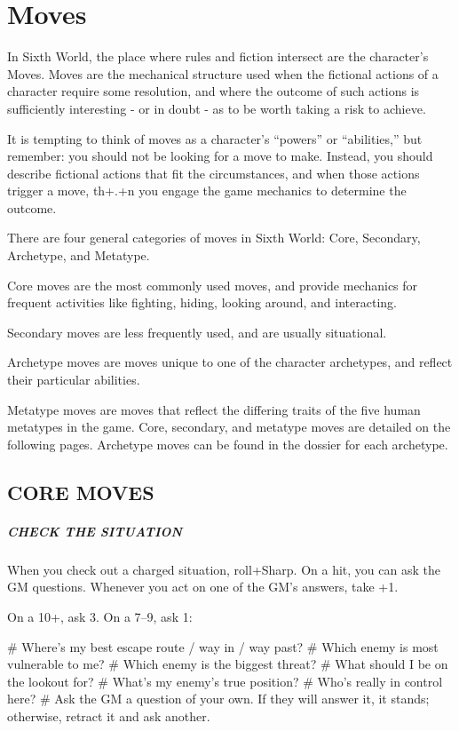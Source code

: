 \chapter{Moves} \label{moves}

In Sixth World, the place where rules and fiction intersect are the character’s Moves. Moves are the mechanical structure used when the fictional actions of a character require some resolution, and where the outcome of such actions is sufficiently interesting - or in doubt - as to be worth taking a risk to achieve.

It is tempting to think of moves as a character’s “powers” or “abilities,” but remember: you should not be looking for a move to make. Instead, you should describe fictional actions that fit the circumstances, and when those actions trigger a move, th+.+n you engage the game mechanics to determine the outcome.

There are four general categories of moves in Sixth World: Core, Secondary, Archetype, and Metatype.

Core moves are the most commonly used moves, and provide mechanics for frequent activities like fighting, hiding, looking around, and interacting.

Secondary moves are less frequently used, and are usually situational.

Archetype moves are moves unique to one of the character archetypes, and reflect their particular abilities.

Metatype moves are moves that reflect the differing traits of the five human metatypes in the game. Core, secondary, and metatype moves are detailed on the following pages. Archetype moves can be found in the dossier for each archetype.

\section{CORE MOVES}

\paragraph{CHECK THE SITUATION}
When you check out a charged situation, roll+Sharp. On a hit, you can ask the GM questions. Whenever you act on one of the GM’s answers, take +1.

On a 10+, ask 3. On a 7–9, ask 1:

\begin{easylist}
# Where’s my best escape route / way in / way past?
# Which enemy is most vulnerable to me?
# Which enemy is the biggest threat?
# What should I be on the lookout for?
# What’s my enemy’s true position?
# Who’s really in control here?
# Ask the GM a question of your own. If they will answer it, it stands; otherwise, retract it and ask another.
\end{easylist}


